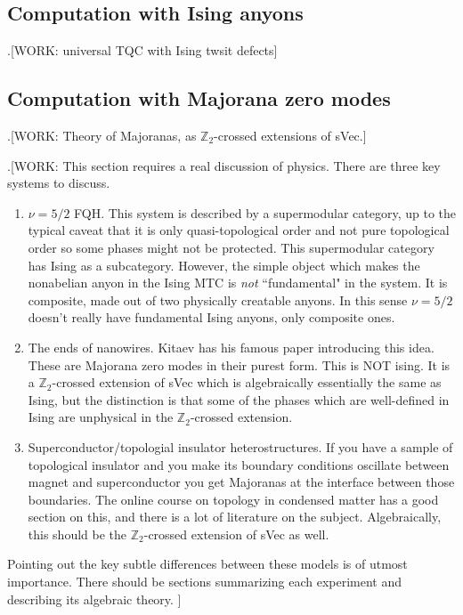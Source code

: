 \documentclass{article}
\theoremstyle{definition}
\newcommand{\ZZ}{\mathbb{Z}}
\newcommand{\0}{\left|0\right>}
\newcommand{\1}{\left|1\right>}
\numberwithin{figure}{section}
\begin{document}
\subsection{Computation with Ising anyons}

.[WORK: universal TQC with Ising twsit defects]

\subsection{Computation with Majorana zero modes}

.[WORK: Theory of Majoranas, as $\ZZ_2$-crossed extensions of sVec.]

.[WORK: This section requires a real discussion of physics. There are three key systems to discuss.

\begin{enumerate}
\item $\nu=5/2$ FQH. This system is described by a supermodular category, up to the typical caveat that it is only quasi-topological order and not pure topological order so some phases might not be protected. This supermodular category has Ising as a subcategory. However, the simple object which makes the nonabelian anyon in the Ising MTC is \textit{not} ``fundamental" in the system. It is composite, made out of two physically creatable anyons. In this sense $\nu =5/2$ doesn't really have fundamental Ising anyons, only composite ones.

\item The ends of nanowires. Kitaev has his famous paper introducing this idea. These are Majorana zero modes in their purest form. This is NOT ising. It is a $\ZZ_2$-crossed extension of sVec which is algebraically essentially the same as Ising, but the distinction is that some of the phases which are well-defined in Ising are unphysical in the $\ZZ_2$-crossed extension.

\item Superconductor/topologial insulator heterostructures. If you have a sample of topological insulator and you make its boundary conditions oscillate between magnet and superconductor you get Majoranas at the interface between those boundaries. The online course on topology in condensed matter has a good section on this, and there is a lot of literature on the subject. Algebraically, this should be the $\ZZ_2$-crossed extension of sVec as well.
\end{enumerate}

Pointing out the key subtle differences between these models is of utmost importance. There should be sections summarizing each experiment and describing its algebraic theory.
]
\end{document}
